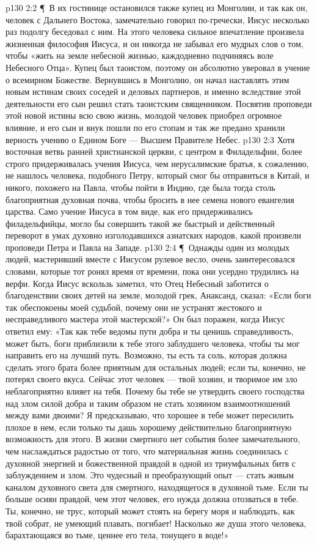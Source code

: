 \vs p130 2:2 \P\ В их гостинице остановился также купец из Монголии, и так как он, человек с Дальнего Востока, замечательно говорил по\hyp{}гречески, Иисус несколько раз подолгу беседовал с ним. На этого человека сильное впечатление произвела жизненная философия Иисуса, и он никогда не забывал его мудрых слов о том, чтобы «жить на земле небесной жизнью, каждодневно подчиняясь воле Небесного Отца». Купец был таоистом, поэтому он абсолютно уверовал в учение о всемирном Божестве. Вернувшись в Монголию, он начал наставлять этим новым истинам своих соседей и деловых партнеров, и именно вследствие этой деятельности его сын решил стать таоистским священником. Посвятив проповеди этой новой истины всю свою жизнь, молодой человек приобрел огромное влияние, и его сын и внук пошли по его стопам и так же предано хранили верность учению о Едином Боге --- Высшем Правителе Небес.
\vs p130 2:3 Хотя восточная ветвь ранней христианской церкви, с центром в Филадельфии, более строго придерживалась учения Иисуса, чем иерусалимские братья, к сожалению, не нашлось человека, подобного Петру, который смог бы отправиться в Китай, и никого, похожего на Павла, чтобы пойти в Индию, где была тогда столь благоприятная духовная почва, чтобы бросить в нее семена нового евангелия царства. Само учение Иисуса в том виде, как его придерживались филадельфийцы, могло бы совершить такой же быстрый и действенный переворот в умах духовно изголодавшихся азиатских народов, какой произвели проповеди Петра и Павла на Западе.
\vs p130 2:4 \P\ Однажды один из молодых людей, мастеривший вместе с Иисусом рулевое весло, очень заинтересовался словами, которые тот ронял время от времени, пока они усердно трудились на верфи. Когда Иисус вскользь заметил, что Отец Небесный заботится о благоденствии своих детей на земле, молодой грек, Анаксанд, сказал: «Если боги так обеспокоены моей судьбой, почему они не устранят жестокого и несправедливого мастера этой мастерской?» Он был поражен, когда Иисус ответил ему: «Так как тебе ведомы пути добра и ты ценишь справедливость, может быть, боги приблизили к тебе этого заблудшего человека, чтобы ты мог направить его на лучший путь. Возможно, ты есть та соль, которая должна сделать этого брата более приятным для остальных людей; если ты, конечно, не потерял своего вкуса. Сейчас этот человек --- твой хозяин, и творимое им зло неблагоприятно влияет на тебя. Почему бы тебе не утвердить своего господства над злом силой добра и таким образом не стать хозяином взаимоотношений между вами двоими? Я предсказываю, что хорошее в тебе может пересилить плохое в нем, если только ты дашь хорошему действительно благоприятную возможность для этого. В жизни смертного нет события более замечательного, чем наслаждаться радостью от того, что материальная жизнь соединилась с духовной энергией и божественной правдой в одной из триумфальных битв с заблуждением и злом. Это чудесный и преобразующий опыт --- стать живым каналом духовного света для смертного, находящегося в духовной тьме. Если ты больше осиян правдой, чем этот человек, его нужда должна отозваться в тебе. Ты, конечно, не трус, который может стоять на берегу моря и наблюдать, как твой собрат, не умеющий плавать, погибает! Насколько же душа этого человека, барахтающаяся во тьме, ценнее его тела, тонущего в воде!»
